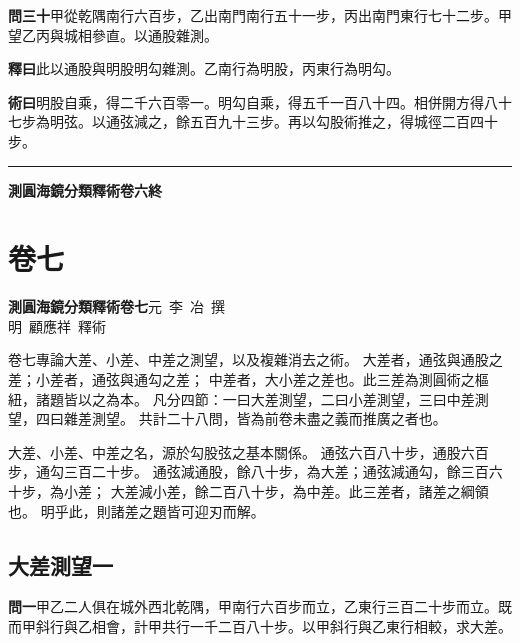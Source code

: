 \documentclass[12pt,a4paper]{article}
\newcommand{\Volume}[1]{\newpage\section*{卷#1}}
\newcommand{\Section}[1]{\subsection*{#1}}
\begin{document}
\vspace{0.5em}

\noindent\textbf{問三十}\quad 甲從乾隅南行六百步，乙出南門南行五十一步，丙出南門東行七十二步。甲望乙丙與城相參直。以通股雜測。

\vspace{0.3em}

\noindent\textbf{釋曰}\quad 此以通股與明股明勾雜測。乙南行為明股，丙東行為明勾。

\vspace{0.3em}

\noindent\textbf{術曰}\quad 明股自乘，得二千六百零一。明勾自乘，得五千一百八十四。相併開方得八十七步為明弦。以通弦減之，餘五百九十三步。再以勾股術推之，得城徑二百四十步。

\vspace{1em}
\begin{center}
\rule{0.5\textwidth}{0.4pt}

\textbf{測圓海鏡分類釋術卷六終}
\end{center}


\Volume{七}

\noindent\textbf{測圓海鏡分類釋術卷七}\quad 元~李~冶~撰\\
明~顧應祥~釋術

\vspace{1em}

\noindent
卷七專論大差、小差、中差之測望，以及複雜消去之術。
大差者，通弦與通股之差；小差者，通弦與通勾之差；
中差者，大小差之差也。此三差為測圓術之樞紐，諸題皆以之為本。
凡分四節：一曰大差測望，二曰小差測望，三曰中差測望，四曰雜差測望。
共計二十八問，皆為前卷未盡之義而推廣之者也。

\vspace{0.5em}

\noindent
大差、小差、中差之名，源於勾股弦之基本關係。
通弦六百八十步，通股六百步，通勾三百二十步。
通弦減通股，餘八十步，為大差；通弦減通勾，餘三百六十步，為小差；
大差減小差，餘二百八十步，為中差。此三差者，諸差之綱領也。
明乎此，則諸差之題皆可迎刃而解。

\Section{大差測望一}

\noindent\textbf{問一}\quad 甲乙二人俱在城外西北乾隅，甲南行六百步而立，乙東行三百二十步而立。既而甲斜行與乙相會，計甲共行一千二百八十步。以甲斜行與乙東行相較，求大差。
\end{document}

